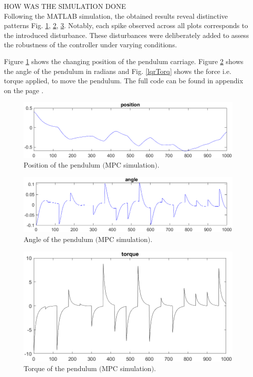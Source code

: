 HOW WAS THE SIMULATION DONE\\

Following the MATLAB simulation, the obtained results reveal distinctive patterns Fig. \ref{mpcPos}, \ref{mpcAng}, \ref{mpcTor}. Notably, each spike observed across all plots corresponds to the introduced disturbance. These disturbances were deliberately added to assess the robustness of the controller under varying conditions.

Figure \ref{mpcPos} shows the changing position of the pendulum carriage. Figure \ref{mpcAng} shows the angle of the pendulum in radians and Fig. \ref{lqrTorq} shows the force i.e. torque applied, to move the pendulum. The full code can be found in appendix on the page \pageref{mpcSim.m}.

\begin{figure}[!tbh]
	\centering
	\includegraphics[width=150mm]{obr/mpcPos.png}
	\caption{Position of the pendulum $($MPC simulation$)$.}\label{mpcPos}
\end{figure}

\begin{figure}[!tbh]
	\centering
	\includegraphics[width=150mm]{obr/mpcAng.png}
	\caption{Angle of the pendulum $($MPC simulation$)$.}\label{mpcAng}
\end{figure}

\begin{figure}[!tbh]
	\centering
	\includegraphics[width=150mm]{obr/mpcTor.png}
	\caption{Torque of the pendulum $($MPC simulation$)$.}\label{mpcTor}
\end{figure}

